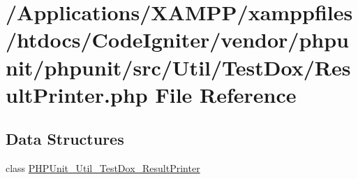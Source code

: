 \hypertarget{_util_2_test_dox_2_result_printer_8php}{}\section{/\+Applications/\+X\+A\+M\+P\+P/xamppfiles/htdocs/\+Code\+Igniter/vendor/phpunit/phpunit/src/\+Util/\+Test\+Dox/\+Result\+Printer.php File Reference}
\label{_util_2_test_dox_2_result_printer_8php}
\subsection*{Data Structures}
\begin{DoxyCompactItemize}
\item 
class \mbox{\hyperlink{class_p_h_p_unit___util___test_dox___result_printer}{P\+H\+P\+Unit\+\_\+\+Util\+\_\+\+Test\+Dox\+\_\+\+Result\+Printer}}
\end{DoxyCompactItemize}
